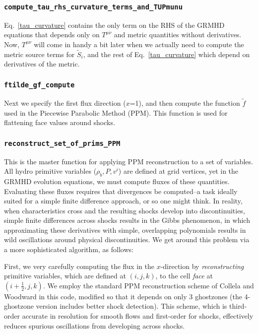 \documentclass[showpacs,amsmath,amssymb,prd]{revtex4}
\begin{document}
\subsubsection{{\tt compute\_tau\_rhs\_curvature\_terms\_and\_TUPmunu}}
Eq.~\ref{tau_curvature} contains the only term on the RHS of the GRMHD
equations that depends only on $T^{\mu\nu}$ and metric quantities without
derivatives. Now, $T^{\mu\nu}$ will come in handy a bit later when we
actually need to compute the metric source terms for $\tilde{S}_i$,
and the rest of Eq.~\ref{tau_curvature} which depend on derivatives of
the metric.

\subsubsection{{\tt ftilde\_gf\_compute}}
Next we specify the first flux direction ($x$=1), and then compute the
function $\tilde{f}$ used in the Piecewise Parabolic Method
(PPM). This function is used for flattening face values around shocks.

\subsubsection{{\tt reconstruct\_set\_of\_prims\_PPM}}
This is the master function for applying PPM reconstruction to a set
of variables. All hydro primitive variables ($\rho_b,P,v^i$) are
defined at grid vertices, yet in the GRMHD evolution equations, we
must compute fluxes of these quantities. Evaluating these fluxes
requires that divergences be computed--a task ideally suited for a
simple finite difference approach, or so one might think. In reality,
when characteristics cross and the resulting shocks develop into
discontinuities, simple finite differences across shocks results in
the Gibbs phenomenon, in which approximating these derivatives with
simple, overlapping polynomials results in wild oscillations around
physical discontinuities. We get around this problem via a more
sophisticated algorithm, as follows:

First, we very carefully computing the flux in the $x$-direction by
{\it reconstructing} primitive variables, which are defined at
$(i,j,k)$, to the cell {\it face} at $(i+\frac{1}{2},j,k)$. We employ
the standard PPM reconstruction scheme of Collela and Woodward in this
code, modified so that it depends on only 3 ghostzones (the
4-ghostzone version includes better shock detection). This scheme,
which is third-order accurate in resolution for smooth flows and
first-order for shocks, effectively reduces spurious oscillations from
developing across shocks. 
\end{document}
